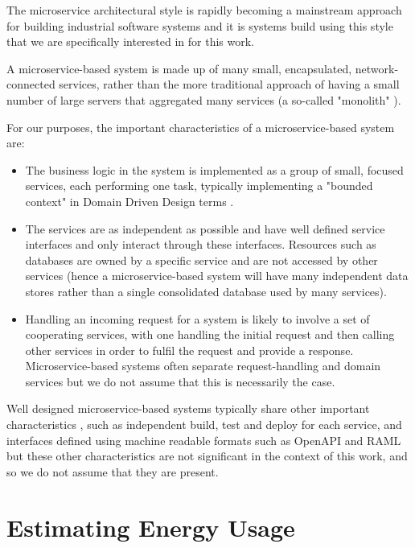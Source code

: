 The microservice architectural style \cite{richardson2018_microservices} is rapidly becoming a mainstream approach for building industrial software systems and it is systems build using this style that we are specifically interested in for this work.

A microservice-based system is made up of many small, encapsulated, network-connected services, rather than the more traditional approach of having a small number of large servers that aggregated many services (a so-called "monolith" \cite{mazlami2017_microservices_monoliths}).

For our purposes, the important characteristics of a microservice-based system are:

\begin{itemize}
\item The business logic in the system is implemented as a group of small, focused services, each performing one task, typically implementing a "bounded context" in Domain Driven Design terms \cite{evans2006_ddd}.
\item The services are as independent as possible and have well defined service interfaces and only interact through these interfaces.  Resources such as databases are owned by a specific service and are not accessed by other services (hence a microservice-based system will have many independent data stores rather than a single consolidated database used by many services).
\item Handling an incoming request for a system is likely to involve a set of cooperating services, with one handling the initial request and then calling other services in order to fulfil the request and provide a response.  Microservice-based systems often separate request-handling and domain services but we do not assume that this is necessarily the case.
\end{itemize}

Well designed microservice-based systems typically share other important characteristics \cite{newman2015_microservices}, such as independent build, test and deploy for each service, and interfaces defined using machine readable formats such as OpenAPI \cite{openapi2018} and RAML \cite{raml2018} but these other characteristics are not significant in the context of this work, and so we do not assume that they are present.

\section{Estimating Energy Usage}


